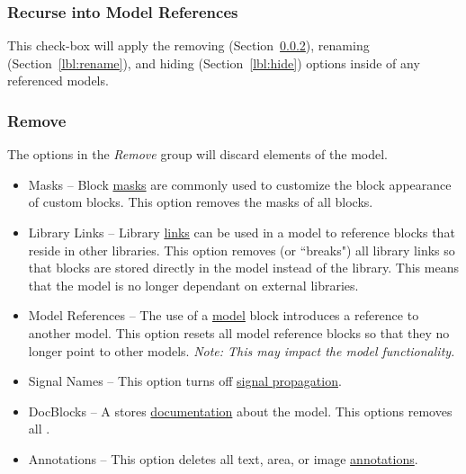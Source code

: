 \documentclass{article}
\begin{document}
\subsubsection{Recurse into Model References}
This check-box will apply the removing (Section~\ref{lbl:remove}), renaming (Section~\ref{lbl:rename}), and hiding (Section~\ref{lbl:hide}) options inside of any referenced models.

\subsubsection{Remove}
\label{lbl:remove}
The options in the \emph{Remove} group will discard elements of the model.

\begin{itemize}
	\item Masks -- Block \href{https://www.mathworks.com/help/simulink/ug/block-masks.html}{masks} are commonly used to customize the block appearance of custom blocks. This option removes the masks of all blocks. 
	
	\item Library Links -- Library \href{https://www.mathworks.com/help/simulink/ug/creating-and-working-with-linked-blocks.html}{links} can be used in a model to reference blocks that reside in other libraries. This option removes (or ``breaks") all library links so that blocks are stored directly in the model instead of the library. This means that the model is no longer dependant on external libraries.
	
	\item Model References -- The use of a \href{https://www.mathworks.com/help/simulink/slref/model.html}{model} block introduces a reference to another model. This option resets all model reference blocks so that they no longer point to other models. \emph{Note: This may impact the model functionality.}
	
	\item Signal Names -- This option turns off \href{https://www.mathworks.com/help/simulink/ug/signal-label-propagation.html}{signal propagation}.
	
	\item DocBlocks -- A \docblock stores \href{https://www.mathworks.com/help/simulink/slref/docblock.html}{documentation} about the model. This options removes all .
	
	\item Annotations -- This option deletes all text, area, or image \href{https://www.mathworks.com/help/simulink/ug/annotations.html}{annotations}.
	

\end{itemize}
\end{document}
